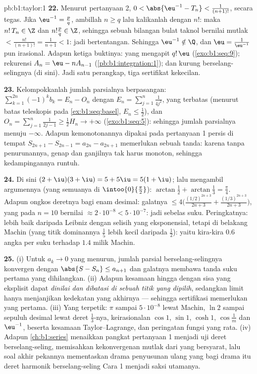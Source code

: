 \begin{solution}{pb:b1:taylor:1}
\textbf{22.} Menurut pertanyaan 2, $0 < \abs{\eu^{-1} - T_n} <
\frac{1}{(n+1)!}$, secara tegas. Jika $\eu^{-1} = \frac pq$, ambillah $n
\geq q$ lalu kalikanlah dengan $n!$: maka $n!\,T_n \in \Z$ dan $n!\frac pq
\in \Z$, sehingga sebuah bilangan bulat taknol bernilai mutlak $<
\frac{n!}{(n+1)!} = \frac{1}{n+1} < 1$: jadi bertentangan. Sehingga
$\eu^{-1} \notin \Q$, dan $\eu = \frac{1}{\eu^{-1}}$ pun
irasional. Adapun ketiga buktinya:  yang mengapit
$q!\,\eu$ (\cref{exo:b1:seq:9}); rekurensi  $A_n =
\eu - nA_{n-1}$ (\cref{pb:b1:integration:1}); dan kurung
berselang-selingnya (di sini). Jadi satu perangkap, tiga sertifikat kekecilan.

\textbf{23.} Kelompokkanlah jumlah parsialnya berpasangan: $\sum_{k=1}^{2n}
(-1)^k b_k = E_n - O_n$ dengan $E_n = \sum_{j=1}^{n}
\frac{1}{4j^2}$, yang terbatas (menurut batas teleskopis pada
\cref{ex:b1:seq:basel}, $E_n \leq \frac12$), dan $O_n =
\sum_{j=1}^{n}\frac{1}{2j-1} \geq \frac12 H_n \to +\infty$
(\cref{exo:b1:seq:5}): sehingga jumlah parsialnya menuju $-\infty$.
Adapun kemonotonannya dipakai pada pertanyaan 1 persis di tempat $S_{2n+1} -
S_{2n-1} = a_{2n} - a_{2n+1}$ memerlukan sebuah tanda: karena tanpa penurunannya,
 genap dan ganjilnya tak harus monoton, sehingga
kedampingannya runtuh.

\textbf{24.} Di sini $(2+\iu)(3+\iu) = 5 + 5\iu = 5(1+\iu)$; lalu mengambil
argumennya (yang semuanya di $\intoo{0}{\frac\pi2}$): $\arctan\frac12 +
\arctan\frac13 = \frac\pi4$. Adapun ongkos deretnya bagi enam desimal:
galatnya $\leq 4\bigl(\frac{(1/2)^{2n+3}}{2n+3} +
\frac{(1/3)^{2n+3}}{2n+3}\bigr)$, yang pada $n = 10$ bernilai
$\approx 2\cdot10^{-8} < 5\cdot10^{-7}$: jadi sebelas suku. Peringkatnya:
lebih baik daripada Leibniz dengan selisih yang eksponensial, tetapi di belakang Machin
(yang titik dominannya $\frac15$ lebih kecil daripada $\frac12$):
yaitu kira-kira $0.6$ angka per suku terhadap $1.4$ milik Machin.

\textbf{25.} (i) Untuk $a_k \to 0$ yang menurun, jumlah parsial
berselang-selingnya konvergen dengan $\abs{S - S_n} \leq a_{n+1}$ dan
galatnya membawa tanda suku pertama yang dihilangkan. (ii) Adapun kesamaan hingga
dengan sisa yang eksplisit dapat \emph{dinilai dan
dibatasi di sebuah titik yang dipilih}, sedangkan  limit hanya
menjanjikan kedekatan yang akhirnya --- sehingga sertifikasi memerlukan yang pertama.
(iii) Yang terpetik: $\pi$ sampai $5\cdot10^{-8}$ lewat Machin, $\ln 2$ sampai
sepuluh desimal lewat deret $\frac13$-nya, keirasionalan $\cos 1$,
$\sin 1$, $\cosh 1$, $\cos\frac1m$ dan $\eu^{-1}$, beserta
kesamaan Taylor--Lagrange, dan peringatan fungsi yang rata. (iv) Adapun
\cref{ch:b1:series} menaikkan pangkat pertanyaan 1 menjadi uji deret
berselang-seling, memisahkan kekonvergenan mutlak dari yang bersyarat,
lalu soal akhir pekannya mementaskan drama penyusunan ulang yang
bagi drama itu deret harmonik berselang-seling Cara 1 menjadi saksi
utamanya.

\end{solution}
